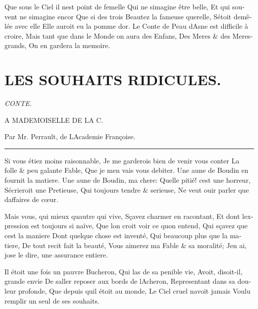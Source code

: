 \documentclass[14pt,a4paper]{memoir}
\begin{document}
\begin{otherlanguage}{french}
{Que sous le Ciel il n\textquotesingle est point de femelle} {Qui ne
s\textquotesingle imagine être belle,} {Et qui souvent ne
s\textquotesingle imagine encor} {Que si des trois Beautez la fameuse
querelle,} {S\textquotesingle étoit demêlée avec elle} {Elle auroit eu
la pomme d\textquotesingle or.} {Le Conte de Peau d\textquotesingle Asne
est difficile à croire, } {Mais tant que dans le Monde on aura des
Enfans, } {Des Meres \& des Meres-grands,} {On en gardera la memoire.}

\section{LES SOUHAITS RIDICULES.}

\emph{CONTE.}

{A MADEMOISELLE DE LA
C.}

{Par Mr. Perrault, de L\textquotesingle Academie Françoise.}

\begin{center}\rule{0.5\linewidth}{0.5pt}\end{center}

{Si vous étiez moins raisonnable,} {Je me garderois bien de venir vous
conter} {La folle \& peu galante Fable,} {Que je m\textquotesingle en
vais vous debiter.} {Une aune de Boudin en fournit la matiere.} {Une
aune de Boudin, ma chere:} {Quelle pitié! c\textquotesingle est une
horreur,} {S\textquotesingle écrieroit une Pretieuse,} {Qui toujours
tendre \& serieuse,} {Ne veut ouir parler que d\textquotesingle affaires
de cœur. }

{Mais vous, qui mieux qu\textquotesingle autre qui vive,} {Sçavez
charmer en racontant,} {Et dont l\textquotesingle expression est
toujours si naïve,} {Que l\textquotesingle on croit voir ce
qu\textquotesingle on entend,} {Qui sçavez que c\textquotesingle est la
maniere} {Dont quelque chose est inventé,} {Qui beaucoup plus que la
matiere,} {De tout recit fait la beauté,} {Vous aimerez ma Fable \& sa
moralité;} {J\textquotesingle en ai, j\textquotesingle ose le dire, une
assurance entiere.}

{Il étoit une fois un pauvre Bucheron,} {Qui las de sa penible vie,}
{Avoit, disoit-il, grande envie} {De s\textquotesingle aller reposer aux
bords de l\textquotesingle Acheron,} {Representant dans sa douleur
profonde,} {Que depuis qu\textquotesingle il étoit au monde,} {Le Ciel
cruel n\textquotesingle avoit jamais} {Voulu remplir un seul de ses
souhaits.}


\end{otherlanguage}
\end{document}

